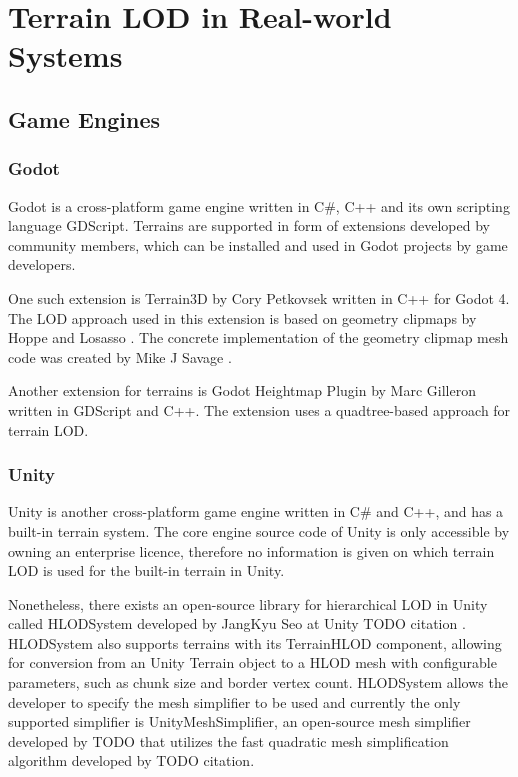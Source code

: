 \chapter{Terrain LOD in Real-world Systems}
\section{Game Engines}
\subsection{Godot}
Godot is a cross-platform game engine written in C\#, C++ and its own scripting language GDScript.
Terrains are supported in form of extensions developed by community members, 
which can be installed and used in Godot projects by game developers.

One such extension is Terrain3D by Cory Petkovsek \cite{godotterrain3dgithub} 
written in C++ for Godot 4. The LOD approach used in this extension is based on 
geometry clipmaps by Hoppe and Losasso \cite{geomclipmaps}. %
The concrete implementation
of the geometry clipmap mesh code was created by Mike J Savage \cite{geomclipmapssavage}. 

Another extension for terrains is Godot Heightmap Plugin by Marc Gilleron \cite{godotheightmapplugingithub} written in GDScript and C++.
The extension uses a quadtree-based approach for terrain LOD. 

\subsection{Unity}
Unity is another cross-platform game engine written in C\# and C++, and has a 
built-in terrain system. The core engine source code of Unity is only accessible
by owning an enterprise licence, therefore no information is given on which 
terrain LOD is used for the built-in terrain in Unity.

Nonetheless, there exists an open-source library for hierarchical LOD in Unity called HLODSystem developed by JangKyu Seo at Unity TODO citation .
HLODSystem also supports terrains with its TerrainHLOD component, allowing for conversion from an Unity Terrain object to a HLOD mesh with configurable parameters, such as chunk size and border vertex count.
HLODSystem allows the developer to specify the mesh simplifier to be used and currently the only supported simplifier is UnityMeshSimplifier, 
an open-source mesh simplifier developed by TODO that utilizes the fast quadratic mesh simplification algorithm developed by TODO citation.

